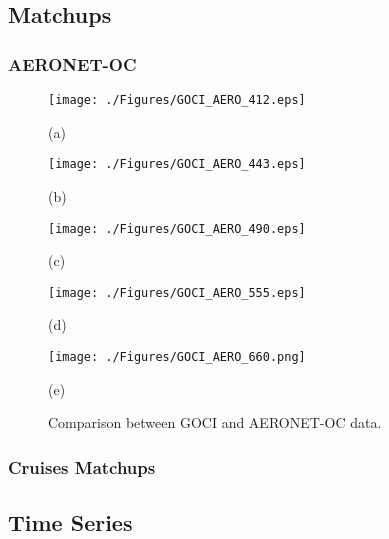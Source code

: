 \documentclass[12pt]{spieman}  %
\begin{document}
\begin{spacing}{2}
\subsection{Matchups}
\subsubsection{AERONET-OC}

\begin{figure}[htb!]
    \begin{minipage}[c]{0.48\linewidth}
      \centering
      \texttt{[image: ./Figures/GOCI\_AERO\_412.eps]}
    \centerline{(a)}\medskip
    \end{minipage}  
    \hfill
    \begin{minipage}[c]{0.48\linewidth}
      \centering
      \texttt{[image: ./Figures/GOCI\_AERO\_443.eps]}
      \centerline{(b)}\medskip
    \end{minipage}  

  \begin{minipage}[c]{0.48\linewidth}
      \centering
      \texttt{[image: ./Figures/GOCI\_AERO\_490.eps]}
    \centerline{(c)}\medskip
    \end{minipage}  
    \hfill
    \begin{minipage}[c]{0.48\linewidth}
      \centering
      \texttt{[image: ./Figures/GOCI\_AERO\_555.eps]}
      \centerline{(d)}\medskip
    \end{minipage}  

  \begin{minipage}[c]{1.0\linewidth}
      \centering
      \texttt{[image: ./Figures/GOCI\_AERO\_660.png]}
      \centerline{(e)}\medskip
    \end{minipage}   

    \caption{Comparison between GOCI and AERONET-OC data. \label{fig:GOCI_AERO} } 
\end{figure}
\subsubsection{Cruises Matchups}

\subsection{Time Series}


\end{spacing}
\end{document}
